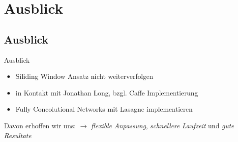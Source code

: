 \section{Ausblick}
\subsection{Ausblick}
\begin{frame}{Ausblick}
    \begin{itemize}
        \item Siliding Window Ansatz nicht weiterverfolgen
        \item in Kontakt mit Jonathan Long, bzgl. Caffe Implementierung
        \item Fully Concolutional Networks mit Lasagne implementieren
    \end{itemize}
    Davon erhoffen wir uns:
    \newline
    $\rightarrow$ \emph{flexible Anpassung},  \emph{schnellere Laufzeit} und  \emph{gute Resultate}
\end{frame}